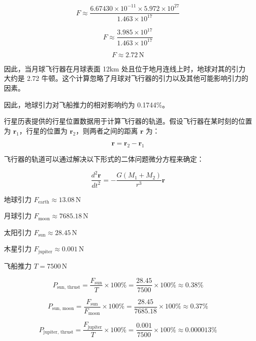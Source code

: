 \documentclass{ctexart}
\begin{document}
\[
F \approx \frac{6.67430 \times 10^{-11} \times 5.972 \times 10^{27}}{1.463 \times 10^{17}}
\]

\[
F \approx \frac{3.985 \times 10^{17}}{1.463 \times 10^{17}}
\]

\[
F \approx 2.72 \, \text{N}
\]

因此，当月球飞行器在月球表面 12km 处且位于地月连线上时，地球对其的引力大约是 2.72 牛顿。这个计算忽略了月球对飞行器的引力以及其他可能影响引力的因素。

因此，地球引力对飞船推力的相对影响约为 0.1744\%。

行星历表提供的行星位置数据用于计算飞行器的轨道。假设飞行器在某时刻的位置为 \( \mathbf{r}_1 \)，行星的位置为 \( \mathbf{r}_2 \)，则两者之间的距离 \( \mathbf{r} \) 为：

\[
\mathbf{r} = \mathbf{r}_2 - \mathbf{r}_1
\]

飞行器的轨道可以通过解决以下形式的二体问题微分方程来确定：

\[
\frac{d^2 \mathbf{r}}{dt^2} = -\frac{G (M_1 + M_2)}{r^3} \mathbf{r}
\]

地球引力 \( F_{\text{earth}} \approx 13.08 \, \text{N} \)

月球引力 \( F_{\text{moon}} \approx 7685.18 \, \text{N} \)

太阳引力 \( F_{\text{sun}} \approx 28.45 \, \text{N} \)

木星引力 \( F_{\text{jupiter}} \approx 0.001 \, \text{N} \)

飞船推力 \( T = 7500 \, \text{N} \)

\begin{equation*}
P_{\text{sun, thrust}} = \frac{F_{\text{sun}}}{T} \times 100\% = \frac{28.45}{7500} \times 100\% \approx 0.38\%
\end{equation*}

\begin{equation*}
P_{\text{sun, moon}} = \frac{F_{\text{sun}}}{F_{\text{moon}}} \times 100\% = \frac{28.45}{7685.18} \times 100\% \approx 0.37\%
\end{equation*}

\begin{equation*}
P_{\text{jupiter, thrust}} = \frac{F_{\text{jupiter}}}{T} \times 100\% = \frac{0.001}{7500} \times 100\% \approx 0.000013\%
\end{equation*}
\end{document}
